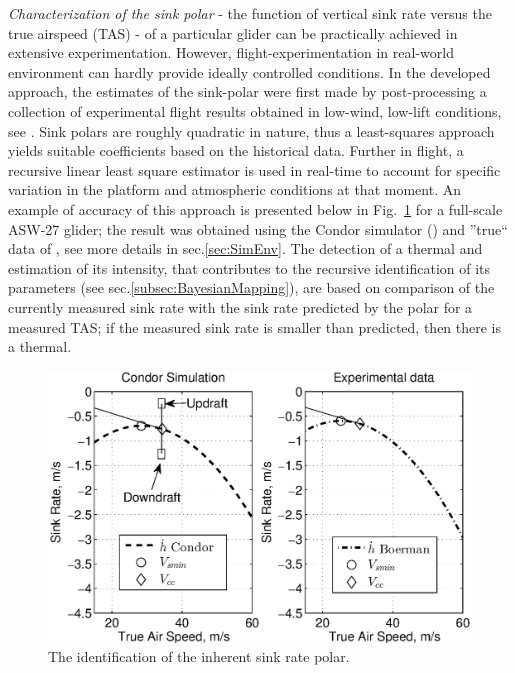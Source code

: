 \documentclass{ifacconf}
\begin{document}
\emph{Characterization of the sink polar} - the function of vertical sink
rate versus the true airspeed (TAS) - of a particular glider can be
practically achieved in extensive experimentation. However,
flight-experimentation in real-world environment can hardly provide ideally
controlled conditions. In the developed approach, the estimates of the
sink-polar were first made by post-processing a collection of experimental
flight results obtained in low-wind, low-lift conditions, see
\cite{AKlass_JGCD:2012}. Sink polars are roughly quadratic in nature, thus a
least-squares approach yields suitable coefficients based on the historical
data. Further in flight, a recursive linear least square estimator is used in
real-time to account for specific variation in the platform and atmospheric
conditions at that moment. An example of accuracy of this approach is
presented below in Fig.~\ref{fig:SinkPolar} for a full-scale ASW-27 glider;
the result was obtained using the Condor simulator
(\cite{Condor:2013:Online}) and ''true`` data of \cite{Boermans:1994}, see
more details in sec.\ref{sec:SimEnv}. The detection of a thermal and
estimation of its intensity, that contributes to the recursive identification
of its parameters (see sec.\ref{subsec:BayesianMapping}), are based on
comparison of the currently measured sink rate with the sink rate predicted
by the polar for a measured TAS; if the measured sink rate is smaller than
predicted, then there is a thermal.
\begin{figure}[thpb]
  \centering
  \includegraphics[scale=0.48]{Figures/Condor_Boermans_comparison_mod_2.eps}
  \caption{The identification of the inherent sink rate polar.}
  \label{fig:SinkPolar}
\end{figure}
\end{document}
